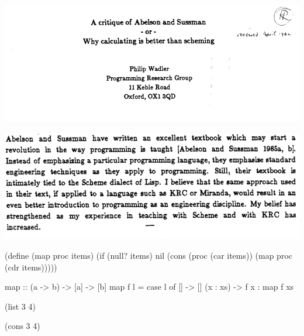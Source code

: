 \documentclass[UKenglish,usenames,dvipsnames,svgnames,table,aspectratio=169,mathserif]{beamer}
\newcommand{\nl}{\vspace{\baselineskip}}
\begin{document}




\begin{frame}
\centering
\includegraphics[scale=0.5]{wadler-title.png}
\end{frame}


\begin{frame}
\centering
\includegraphics[scale=0.55]{wadler-abstract.png}
\end{frame}


\begin{frame}[fragile]
\begin{schemecode}
(define (map proc items)
  (if (null? items)
      nil
      (cons (proc (car items))
            (map proc (cdr items)))))
\end{schemecode}
\nl

\begin{haskellcode}
map :: (a -> b) -> [a] -> [b]
map f l =
  case l of
    []       -> []
    (x : xs) -> f x : map f xs
\end{haskellcode}
\end{frame}


\begin{frame}[fragile]
\LARGE
\begin{schemecode}
             (list 3 4)

             (cons 3 4)
\end{schemecode}
\end{frame}
\end{document}
